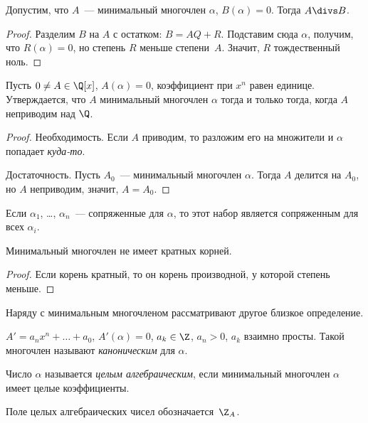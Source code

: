 \begin{stm}
  Допустим, что $A$~--- минимальный многочлен $\alpha$, $B(\alpha) =
  0$. Тогда $A \divs B$.
\end{stm}
\begin{proof}
  Разделим $B$ на $A$ с остатком: $B = AQ + R$. Подставим сюда
  $\alpha$, получим, что $R(\alpha) = 0$, но степень $R$ меньше
  степени~$A$. Значит, $R$ тождественный ноль.
\end{proof}

\begin{stm}
  Пусть $0 \ne A \in \Q[x]$, $A(\alpha) = 0$, коэффициент при $x^n$
  равен единице. Утверждается, что $A$ минимальный многочлен $\alpha$
  тогда и только тогда, когда $A$ неприводим над $\Q$.
\end{stm}
\begin{proof}
  Необходимость. Если $A$ приводим, то разложим его на множители и
  $\alpha$ попадает \emph{куда-то}.

  Достаточность. Пусть $A_0$~--- минимальный многочлен $\alpha$. Тогда
  $A$ делится на $A_0$, но $A$ неприводим, значит, $A = A_0$.
\end{proof}

\begin{stm}
  Если $\alpha_1$, \ldots, $\alpha_n$~--- сопряженные для $\alpha$, то
  этот набор является сопряженным для всех $\alpha_i$.
\end{stm}

\begin{stm}
  Минимальный многочлен не имеет кратных корней.
\end{stm}
\begin{proof}
  Если корень кратный, то он корень производной, у которой степень
  меньше.
\end{proof}

Наряду с минимальным многочленом рассматривают другое близкое
определение.

\begin{df}
  $A' = a_n x^n + \ldots + a_0$, $A'(\alpha) = 0$, $a_k \in \Z$, $a_n
  > 0$, $a_k$ взаимно просты. Такой многочлен называют
  \emph{каноническим} для $\alpha$.
\end{df}

\begin{df}
  Число $\alpha$ называется \emph{целым алгебраическим}, если
  минимальный многочлен $\alpha$ имеет целые коэффициенты.
\end{df}
\begin{denote}
  Поле целых алгебраических чисел обозначается~$\Z_A$.
\end{denote}

